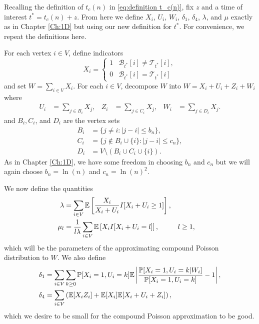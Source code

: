 Recalling the definition of $t_c(n)$ in \eqref{eq:definition t_c(n)}, fix $z$ and a time of interest $t^* = t_c(n) + z$. From here we define $X_i$, $U_i$, $W_i$, $\delta_1$, $\delta_4$, $\lambda$, and $\mu$ exactly as in Chapter \ref{Ch:1D} but using our new definition for $t^*$. For convenience, we repeat the definitions here.

For each vertex $i \in V$, define indicators
	\begin{equation}
		X_i = 
		\begin{cases}
			1 & \mathscr{B}_{t^*}[i] \neq \mathscr{T}_{t^*}[i],\\
			0 & \mathscr{B}_{t^*}[i] = \mathscr{T}_{t^*}[i]
		\end{cases}
	\end{equation}
	and set $W = \sum_{i \in V} X_i$.
	For each $i \in V$, decompose $W$ into $W = X_i + U_i + Z_i + W_i$ where
	\begin{align}
		U_i &= \sum_{j \in B_i} X_j, &
		Z_i &= \sum_{j \in C_i} X_j, &
		W_i &= \sum_{j \in D_i} X_j.
	\end{align}
	and $B_i, C_i$, and $D_i$ are the vertex sets
	\begin{align}
		B_i &= \{j\neq i : |j - i| \leq b_n \},\\
		C_i &= \{j\notin B_i\cup \{i\}: |j - i| \leq c_n \},\\
		D_i &= V \setminus (B_i \cup C_i \cup \{i\}).
	\end{align}
	As in Chapter \ref{Ch:1D}, we have some freedom in choosing $b_n$ and $c_n$ but we will again choose $b_n = \ln(n)$ and $c_n = \ln(n)^2$.

	We now define the quantities
	\begin{align}
		\lambda &= \sum_{i \in V} \mathbb{E}\left[\frac{X_i}{X_i + U_i} I[ X_i + U_i \geq 1] \right],\\
		\mu_l &= \frac{1}{l \lambda} \sum_{i \in V} \mathbb{E}\left[ X_i I[X_i + U_i = l] \right], && l\geq 1,
	\end{align}
	which will be the parameters of the approximating compound Poisson distribution to $W$. We also define
	\begin{align}
		\delta_1 &= \sum_{i \in V}  \sum_{k \geq 0} \mathbb{P}[X_i = 1, U_i = k] \mathbb{E} \left|\frac{\mathbb{P}[X_i = 1, U_i = k|W_i]}{\mathbb{P}[X_i = 1, U_i = k]} - 1 \right|, \label{eq:delta1 nD}\\ 
		\delta_4 &= \sum_{i \in V} \left( \mathbb{E}[X_i Z_i] + \mathbb{E}[X_i] \mathbb{E}[X_i + U_i + Z_i] \right), \label{eq:delta4 nD}
	\end{align}
	which we desire to be small for the compound Poisson approximation to be good.

